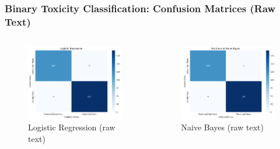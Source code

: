 \documentclass{beamer}
\begin{document}
\begin{frame}
\frametitle{Binary Toxicity Classification: Confusion Matrices (Raw Text)}

\begin{columns}
\begin{column}{0.5\textwidth}
\begin{figure}
\centering
\includegraphics[width=\linewidth]{figures/confusion_lr_no_pre.png}
\caption{Logistic Regression (raw text)}
\end{figure}
\end{column}

\begin{column}{0.5\textwidth}
\begin{figure}
\centering
\includegraphics[width=\linewidth]{figures/confusion_nb_no_pre.png}
\caption{Naive Bayes (raw text)}
\end{figure}
\end{column}
\end{columns}

\end{frame}
\end{document}
